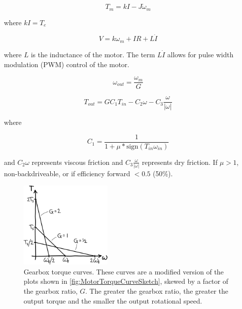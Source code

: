 \begin{equation}
T_{m}=kI-J\dot{\omega}_{m}
\label{eq:CompleteMotorLaw1}
\end{equation}

where $kI=T_{e}$

\begin{equation}
V=k\omega_{m}+IR+L\dot{I}
\label{eq:CompleteMotorLaw2}
\end{equation}

where $L$ is the inductance of the motor. The term $L\dot{I}$ allows for pulse width modulation (PWM) control of the motor.

\begin{equation}
\omega_{out}=\frac{\omega_{m}}{G}
\label{eq:CompleteMotorLaw3}
\end{equation}

\begin{equation}
T_{out}=GC_{1}T_{in}-C_{2}\omega-C_{3}\frac{\omega}{|\omega|}
\label{eq:CompleteMotorLaw4}
\end{equation}

where

\begin{equation}
C_{1}=\frac{1}{1+\mu* \mbox{sign}\left(T_{in}\omega_{in}\right)}
\label{eq:CompleteMotorLaw5}
\end{equation}

and $C_{2}\omega$ represents viscous friction and $C_{3}\frac{\omega}{|\omega|}$ represents dry friction. If $\mu > 1$, non-backdriveable, or if efficiency forward $< 0.5$ (50\%).

\begin{figure}[htb]		%
\begin{centering}
\includegraphics[width=0.4\textwidth]{Figures/GearboxCurves}\par
\end{centering}
\caption[Plot: Gearbox Torque Curves]{Gearbox torque curves. These curves are a modified version of the plots shown in \ref{fig:MotorTorqueCurveSketch}, skewed by a factor of the gearbox ratio, $G$. The greater the gearbox ratio, the greater the output torque and the smaller the output rotational speed.}
\label{fig:GearboxCurves}
\end{figure}
%

